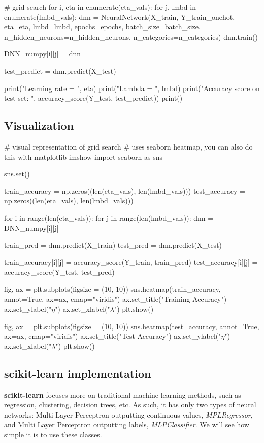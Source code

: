 \documentclass[%
oneside,                 %
final,                   %
10pt]{article}
\begin{document}
# grid search
for i, eta in enumerate(eta_vals):
    for j, lmbd in enumerate(lmbd_vals):
        dnn = NeuralNetwork(X_train, Y_train_onehot, eta=eta, lmbd=lmbd, epochs=epochs, batch_size=batch_size,
                            n_hidden_neurons=n_hidden_neurons, n_categories=n_categories)
        dnn.train()
        
        DNN_numpy[i][j] = dnn
        
        test_predict = dnn.predict(X_test)
        
        print("Learning rate  = ", eta)
        print("Lambda = ", lmbd)
        print("Accuracy score on test set: ", accuracy_score(Y_test, test_predict))
        print()
\epycod

\subsection{Visualization}

\bpycod
# visual representation of grid search
# uses seaborn heatmap, you can also do this with matplotlib imshow
import seaborn as sns

sns.set()

train_accuracy = np.zeros((len(eta_vals), len(lmbd_vals)))
test_accuracy = np.zeros((len(eta_vals), len(lmbd_vals)))

for i in range(len(eta_vals)):
    for j in range(len(lmbd_vals)):
        dnn = DNN_numpy[i][j]
        
        train_pred = dnn.predict(X_train) 
        test_pred = dnn.predict(X_test)

        train_accuracy[i][j] = accuracy_score(Y_train, train_pred)
        test_accuracy[i][j] = accuracy_score(Y_test, test_pred)

        
fig, ax = plt.subplots(figsize = (10, 10))
sns.heatmap(train_accuracy, annot=True, ax=ax, cmap="viridis")
ax.set_title("Training Accuracy")
ax.set_ylabel("$\eta$")
ax.set_xlabel("$\lambda$")
plt.show()

fig, ax = plt.subplots(figsize = (10, 10))
sns.heatmap(test_accuracy, annot=True, ax=ax, cmap="viridis")
ax.set_title("Test Accuracy")
ax.set_ylabel("$\eta$")
ax.set_xlabel("$\lambda$")
plt.show()
\epycod

\subsection{scikit-learn implementation}

\textbf{scikit-learn} focuses more
on traditional machine learning methods, such as regression,
clustering, decision trees, etc. As such, it has only two types of
neural networks: Multi Layer Perceptron outputting continuous values,
\emph{MPLRegressor}, and Multi Layer Perceptron outputting labels,
\emph{MLPClassifier}. We will see how simple it is to use these classes.
\end{document}

